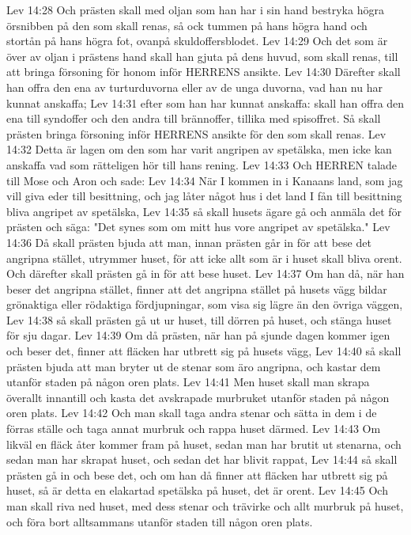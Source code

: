 Lev 14:28  Och prästen skall med oljan som han har i sin hand bestryka högra örsnibben på den som skall renas, så ock tummen på hans högra hand och stortån på hans högra fot, ovanpå skuldoffersblodet.
Lev 14:29  Och det som är över av oljan i prästens hand skall han gjuta på dens huvud, som skall renas, till att bringa försoning för honom inför HERRENS ansikte.
Lev 14:30  Därefter skall han offra den ena av turturduvorna eller av de unga duvorna, vad han nu har kunnat anskaffa;
Lev 14:31  efter som han har kunnat anskaffa: skall han offra den ena till syndoffer och den andra till brännoffer, tillika med spisoffret. Så skall prästen bringa försoning inför HERRENS ansikte för den som skall renas.
Lev 14:32  Detta är lagen om den som har varit angripen av spetälska, men icke kan anskaffa vad som rätteligen hör till hans rening.
Lev 14:33  Och HERREN talade till Mose och Aron och sade:
Lev 14:34  När I kommen in i Kanaans land, som jag vill giva eder till besittning, och jag låter något hus i det land I fån till besittning bliva angripet av spetälska,
Lev 14:35  så skall husets ägare gå och anmäla det för prästen och säga: "Det synes som om mitt hus vore angripet av spetälska."
Lev 14:36  Då skall prästen bjuda att man, innan prästen går in för att bese det angripna stället, utrymmer huset, för att icke allt som är i huset skall bliva orent. Och därefter skall prästen gå in för att bese huset.
Lev 14:37  Om han då, när han beser det angripna stället, finner att det angripna stället på husets vägg bildar grönaktiga eller rödaktiga fördjupningar, som visa sig lägre än den övriga väggen,
Lev 14:38  så skall prästen gå ut ur huset, till dörren på huset, och stänga huset för sju dagar.
Lev 14:39  Om då prästen, när han på sjunde dagen kommer igen och beser det, finner att fläcken har utbrett sig på husets vägg,
Lev 14:40  så skall prästen bjuda att man bryter ut de stenar som äro angripna, och kastar dem utanför staden på någon oren plats.
Lev 14:41  Men huset skall man skrapa överallt innantill och kasta det avskrapade murbruket utanför staden på någon oren plats.
Lev 14:42  Och man skall taga andra stenar och sätta in dem i de förras ställe och taga annat murbruk och rappa huset därmed.
Lev 14:43  Om likväl en fläck åter kommer fram på huset, sedan man har brutit ut stenarna, och sedan man har skrapat huset, och sedan det har blivit rappat,
Lev 14:44  så skall prästen gå in och bese det, och om han då finner att fläcken har utbrett sig på huset, så är detta en elakartad spetälska på huset, det är orent.
Lev 14:45  Och man skall riva ned huset, med dess stenar och trävirke och allt murbruk på huset, och föra bort alltsammans utanför staden till någon oren plats.
